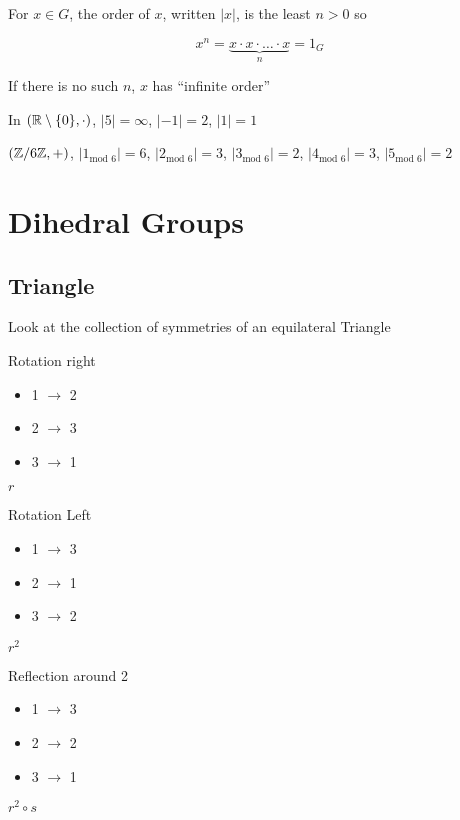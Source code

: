 \begin{definition*}
  For $x \in G$, the order of $x$, written $|x|$, is the least $n > 0$ so

  \[x^n = \underbrace{x\cdot x\cdot \dotsc \cdot x}_n = 1_G\]
\end{definition*}
If there is no such $n$, $x$ has ``infinite order''
\begin{example*}
  In $(\mathbb R \setminus \{0\}, \cdot)$, $|5| = \infty$, $|-1| = 2$, $|1| = 1$
\end{example*}

\begin{example*}
  $(\mathbb Z/6\mathbb Z, +)$, $|1_{\text{mod } 6}| = 6$, $|2_{\text{mod } 6}| = 3$, $|3_{\text{mod } 6}| = 2$, $|4_{\text{mod } 6}| = 3$, $|5_{\text{mod } 6}| = 2$
\end{example*}

\section{Dihedral Groups}

\subsection{Triangle}

Look at the collection of symmetries of an equilateral Triangle

\begin{center}
\end{center}

\begin{multicols}{3}
Rotation right
\begin{itemize}
  \item 1 $\rightarrow$ 2
  \item 2 $\rightarrow$ 3
  \item 3 $\rightarrow$ 1
\end{itemize}
$r$
\par

Rotation Left
\begin{itemize}
  \item 1 $\rightarrow$ 3
  \item 2 $\rightarrow$ 1
  \item 3 $\rightarrow$ 2
\end{itemize}
$r^2$

\par
Reflection around 2
\begin{itemize}
  \item 1 $\rightarrow$ 3
  \item 2 $\rightarrow$ 2
  \item 3 $\rightarrow$ 1
\end{itemize}
$r^2 \circ s$

\end{multicols}

